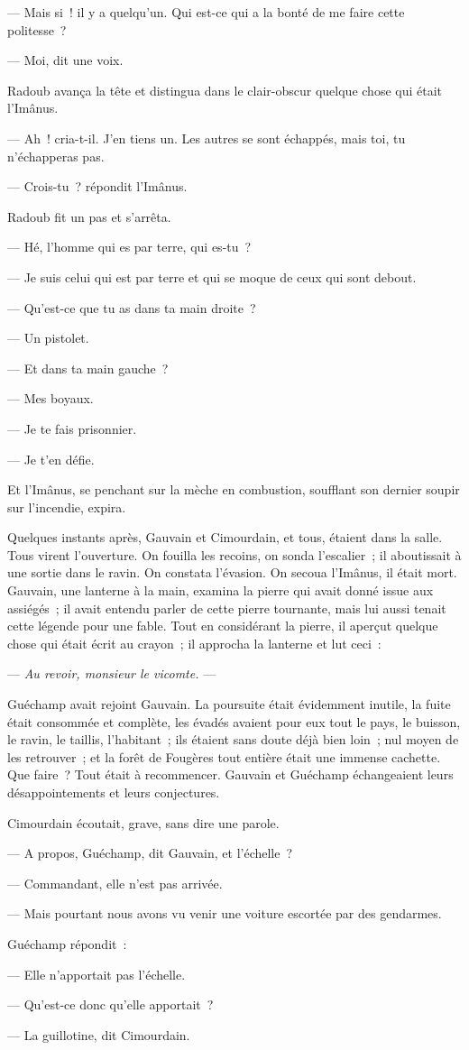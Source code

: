 \documentclass[french,twoside]{book} %
\newcommand{\byline}[1]{\bigskip{\RaggedLeft{#1}\par}\bigskip}
\begin{document}
— Mais si ! il y a quelqu’un. Qui est-ce qui a la bonté de me faire cette politesse ?\par
— Moi, dit une voix.\par
Radoub avança la tête et distingua dans le clair-obscur quelque chose qui était l’Imânus.\par
— Ah ! cria-t-il. J’en tiens un. Les autres se sont échappés, mais toi, tu n’échapperas pas.\par
— Crois-tu ? répondit l’Imânus.\par
Radoub fit un pas et s’arrêta.\par
— Hé, l’homme qui es par terre, qui es-tu ?\par
— Je suis celui qui est par terre et qui se moque de ceux qui sont debout.\par
— Qu’est-ce que tu as dans ta main droite ?\par
 — Un pistolet.\par
— Et dans ta main gauche ?\par
— Mes boyaux.\par
— Je te fais prisonnier.\par
— Je t’en défie.\par
Et l’Imânus, se penchant sur la mèche en combustion, soufflant son dernier soupir sur l’incendie, expira.\par
Quelques instants après, Gauvain et Cimourdain, et tous, étaient dans la salle. Tous virent l’ouverture. On fouilla les recoins, on sonda l’escalier ; il aboutissait à une sortie dans le ravin. On constata l’évasion. On secoua l’Imânus, il était mort. Gauvain, une lanterne à la main, examina la pierre qui avait donné issue aux assiégés ; il avait entendu parler de cette pierre tournante, mais lui aussi tenait cette légende pour une fable. Tout en considérant la pierre, il aperçut quelque chose qui était écrit au crayon ; il approcha la lanterne et lut ceci :\par
— \emph{Au revoir, monsieur le vicomte.} — \par

\byline{L{\scshape antenac}}
\noindent Guéchamp avait rejoint Gauvain. La poursuite était évidemment inutile, la fuite était consommée et complète, les évadés avaient pour eux tout le pays, le buisson, le ravin, le taillis, l’habitant ; ils étaient sans doute déjà bien loin ; nul moyen de les retrouver ; et la forêt de Fougères tout entière était une immense cachette. Que faire ? Tout était à recommencer. Gauvain et Guéchamp échangeaient leurs désappointements et leurs conjectures.\par
 Cimourdain écoutait, grave, sans dire une parole.\par
— A propos, Guéchamp, dit Gauvain, et l’échelle ?\par
— Commandant, elle n’est pas arrivée.\par
— Mais pourtant nous avons vu venir une voiture escortée par des gendarmes.\par
Guéchamp répondit :\par
— Elle n’apportait pas l’échelle.\par
— Qu’est-ce donc qu’elle apportait ?\par
— La guillotine, dit Cimourdain.
\end{document}
